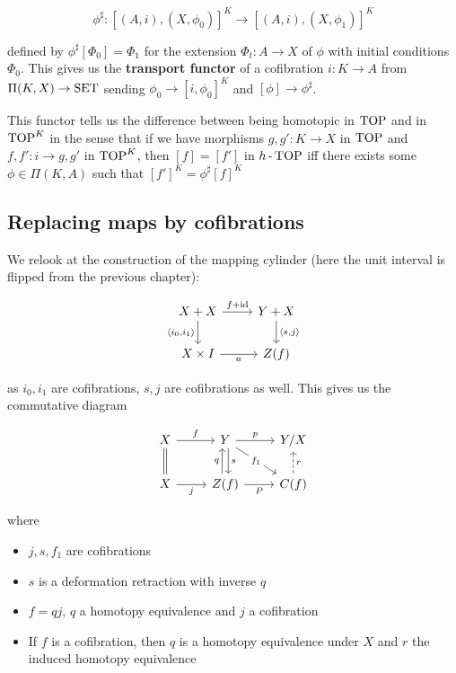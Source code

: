\[\phi^\sharp:\left[\left(A,i\right),\left(X,\phi_0\right)\right]^K\to\left[\left(A,i\right),\left(X,\phi_1\right)\right]^K\]

defined by $\phi^\sharp\left[\Phi_0\right]=\Phi_1$ for the extension $\Phi_t:A\to X$ of $\phi$ with initial conditions $\Phi_0$. This gives us the \textbf{transport functor} of a cofibration $i:K\to A$ from $\Pi(K,X)\to\operatorname{SET}$ sending $\phi_0\to\left[i,\phi_0\right]^K$ and $[\phi]\to\phi^\sharp$.

This functor tells us the difference between being homotopic in $\operatorname{TOP}$ and in $\operatorname{TOP}^K$ in the sense that if we have morphisms $g,g':K\to X$ in $\operatorname{TOP}$ and $f,f':i\to g,g'$ in $\operatorname{TOP}^K$, then $[f]=[f']$ in $h\operatorname{-}\operatorname{TOP}$ iff there exists some $\phi\in\Pi(K,A)$ such that $[f']^K=\phi^\sharp[f]^K$

\subsection{Replacing maps by cofibrations}

We relook at the construction of the mapping cylinder (here the unit interval is flipped from the previous chapter):

\[\begin{tikzcd}
	{X+X} & {Y+X} \\
	{X\times I} & {Z(f)}
	\arrow["{f+\id}", from=1-1, to=1-2]
	\arrow["{\left<s,j\right>}", from=1-2, to=2-2]
	\arrow["{\left<i_0,i_1\right>}"', from=1-1, to=2-1]
	\arrow["a"', from=2-1, to=2-2]
\end{tikzcd}\]

as $i_0,i_1$ are cofibrations, $s,j$ are cofibrations as well. This gives us the commutative diagram

\[\begin{tikzcd}
	X & Y & {Y/X} \\
	X & {Z(f)} & {C(f)}
	\arrow["{f_1}"{description}, from=1-2, to=2-3]
	\arrow[Rightarrow, no head, from=1-1, to=2-1]
	\arrow["j"', from=2-1, to=2-2]
	\arrow["f", from=1-1, to=1-2]
	\arrow["p", from=1-2, to=1-3]
	\arrow["r"', dashed, from=2-3, to=1-3]
	\arrow["P"', from=2-2, to=2-3]
	\arrow["s", shift left=1, from=1-2, to=2-2]
	\arrow["q", shift left=1, from=2-2, to=1-2]
\end{tikzcd}\]

where

\begin{itemize}
    \item $j,s,f_1$ are cofibrations
    \item $s$ is a deformation retraction with inverse $q$
    \item $f=qj$, $q$ a homotopy equivalence and $j$ a cofibration
    \item If $f$ is a cofibration, then $q$ is a homotopy equivalence under $X$ and $r$ the induced homotopy equivalence
\end{itemize}


